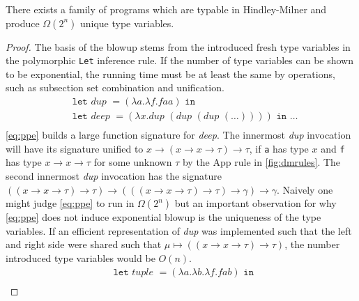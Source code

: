 \begin{lemma}
    There exists a family of programs which are typable in Hindley-Milner and produce $\Omega(2^n)$ unique type variables.
\end{lemma}
\begin{proof}
    The basis of the blowup stems from the introduced fresh type variables in the polymorphic \texttt{Let} inference rule.
    If the number of type variables can be shown to be exponential, the running time must be at least the same by operations, such as subsection set combination and unification.
    \begin{align}
      &\texttt{let } \textit{dup } = (\lambda a .\lambda f . f a a) \texttt{ in } \label{eq:ppe}\\
      &\texttt{let } \textit{deep } = (\lambda x . \textit{dup } (\textit{dup } (\textit{dup } (\dots)))) \texttt{ in } \dots \tag*{}\\
    \end{align}
    \autoref{eq:ppe} builds a large function signature for \textit{deep}.
    The innermost \textit{dup} invocation will have its signature unified to $x \rightarrow (x \rightarrow x \rightarrow \tau) \rightarrow \tau$, if \texttt{a} has type $x$ and \texttt{f} has type $x \rightarrow x \rightarrow \tau$ for some unknown $\tau$ by the App rule in \autoref{fig:dmrules}.
    The second innermost \textit{dup} invocation has the signature $((x \rightarrow x \rightarrow \tau) \rightarrow \tau) \rightarrow (((x \rightarrow x \rightarrow \tau) \rightarrow \tau) \rightarrow \gamma) \rightarrow \gamma$.
    Naively one might judge \autoref{eq:ppe} to run in $\Omega(2^n)$ but an important observation for why \autoref{eq:ppe} does not induce exponential blowup is the uniqueness of the type variables.
    If an efficient representation of \textit{dup} was implemented such that the left and right side were shared such that $\mu \mapsto ((x \rightarrow x \rightarrow \tau) \rightarrow \tau)$, the number introduced type variables would be $O(n)$.
    \begin{align}
      &\texttt{let } \textit{tuple } = (\lambda a . \lambda b . \lambda f . f a b) \texttt{ in } \label{eq:ppexp}\\

\end{align}
\end{proof}
